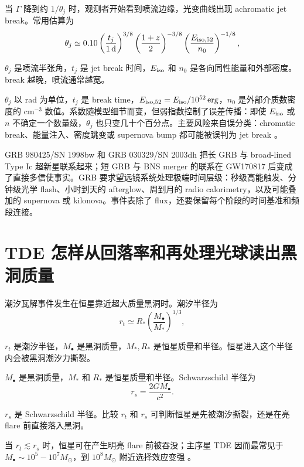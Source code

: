 当 \(\Gamma\) 降到约 \(1/\theta_j\) 时，观测者开始看到喷流边缘，光变曲线出现 achromatic jet break。常用估算为
\begin{equation}
  \theta_j\simeq
  0.10
  \left(\frac{t_j}{1\,{\rm d}}\right)^{3/8}
  \left(\frac{1+z}{2}\right)^{-3/8}
  \left(\frac{E_{\rm iso,52}}{n_0}\right)^{-1/8},
  \label{eq:ch13-jet-opening-angle}
\end{equation}
\begin{formulaexplain}
\(\theta_j\) 是喷流半张角，\(t_j\) 是 jet break 时间，\(E_{\rm iso}\) 和 \(n_0\) 是各向同性能量和外部密度。break 越晚，喷流通常越宽。
\end{formulaexplain}
\(\theta_j\) 以 rad 为单位，\(t_j\) 是 break time，\(E_{\rm iso,52}=E_{\rm iso}/10^{52}\,\mathrm{erg}\)，\(n_0\) 是外部介质数密度的 \(\mathrm{cm^{-3}}\) 数值。系数随模型细节而变，但弱指数控制了误差传播：即使 \(E_{\rm iso}\) 或 \(n\) 不确定一个数量级，\(\theta_j\) 也只变几十个百分点。主要风险来自误分类：chromatic break、能量注入、密度跳变或 supernova bump 都可能被误判为 jet break \citep{2003Natur.423..847H,2004ApJ...611.1005G}。

GRB 980425/SN 1998bw 和 GRB 030329/SN 2003dh 把长 GRB 与 broad-lined Type Ic 超新星联系起来；短 GRB 与 BNS merger 的联系在 GW170817 后变成了直接多信使事实。GRB 要求望远镜系统处理极端时间层级：秒级高能触发、分钟级光学 flash、小时到天的 afterglow、周到月的 radio calorimetry，以及可能叠加的 supernova 或 kilonova。事件表除了 flux，还要保留每个阶段的时间基准和频段连接。

\section{TDE 怎样从回落率和再处理光球读出黑洞质量}

潮汐瓦解事件发生在恒星靠近超大质量黑洞时。潮汐半径为
\begin{equation}
  r_t\simeq R_\ast\left(\frac{M_\bullet}{M_\ast}\right)^{1/3},
  \label{eq:ch13-tidal-radius}
\end{equation}
\begin{formulaexplain}
\(r_t\) 是潮汐半径，\(M_\bullet\) 是黑洞质量，\(M_\ast,R_\ast\) 是恒星质量和半径。恒星进入这个半径内会被黑洞潮汐力撕裂。
\end{formulaexplain}
\(M_\bullet\) 是黑洞质量，\(M_\ast\) 和 \(R_\ast\) 是恒星质量和半径。Schwarzschild 半径为
\begin{equation}
  r_s=\frac{2GM_\bullet}{c^2}.
  \label{eq:ch13-schwarzschild-radius-tde}
\end{equation}
\begin{formulaexplain}
\(r_s\) 是 Schwarzschild 半径。比较 \(r_t\) 和 \(r_s\) 可判断恒星是先被潮汐撕裂，还是在亮 flare 前直接落入黑洞。
\end{formulaexplain}
当 \(r_t\lesssim r_s\) 时，恒星可在产生明亮 flare 前被吞没；主序星 TDE 因而最常见于 \(M_\bullet\sim10^5-10^7M_\odot\)，到 \(10^8M_\odot\) 附近选择效应变强 \citep{1988Natur.333..523R,2021ARA&A..59...21G}。

